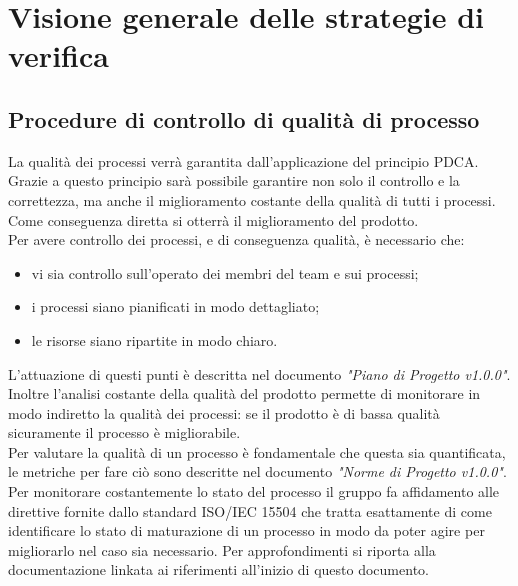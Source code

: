 \documentclass[12pt,a4paper,titlepage]{article}
\begin{document}
	\newpage
	\section{Visione generale delle strategie di verifica}
	\subsection{Procedure di controllo di qualità di processo}
	La qualità dei processi verrà garantita dall'applicazione del principio PDCA. Grazie a questo principio sarà possibile garantire non solo il controllo e la correttezza, ma anche il miglioramento costante della qualità di tutti i processi. Come conseguenza diretta si otterrà il miglioramento del prodotto.\\
	Per avere controllo dei processi, e di conseguenza qualità, è necessario che:
	\begin{itemize}
		\item vi sia controllo sull'operato dei membri del team e sui processi;
		\item i processi siano pianificati in modo dettagliato;
		\item le risorse siano ripartite in modo chiaro.
	\end{itemize}
	L'attuazione di questi punti è descritta nel documento \textit{"Piano di Progetto v1.0.0"}. Inoltre l'analisi costante della qualità del prodotto permette di monitorare in modo indiretto la qualità dei processi: se il prodotto è di bassa qualità sicuramente il processo è migliorabile.\\
	Per valutare la qualità di un processo è fondamentale che questa sia quantificata, le metriche per fare ciò sono descritte nel documento \textit{"Norme di Progetto v1.0.0"}.\\
	
	Per monitorare costantemente lo stato del processo il gruppo fa affidamento alle direttive fornite dallo standard ISO/IEC 15504 che tratta esattamente di come identificare lo stato di maturazione di un processo in modo da poter agire per migliorarlo nel caso sia necessario. Per approfondimenti si riporta alla documentazione linkata ai riferimenti all'inizio di questo documento.\\
	
\end{document}
